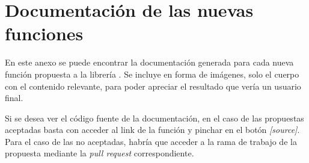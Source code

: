 \chapter{Documentación de las nuevas funciones} \label{chp:anexo_docs_funcs}

En este anexo se puede encontrar la documentación generada para cada nueva función propuesta a la librería \pvlibpy. Se incluye en forma de imágenes, solo el cuerpo con el contenido relevante, para poder apreciar el resultado que vería un usuario final.

Si se desea ver el código fuente de la documentación, en el caso de las propuestas aceptadas basta con acceder al link de la función y pinchar en el botón \textit{[source]}. Para el caso de las no aceptadas, habría que acceder a la \gls{rama} de trabajo de la propuesta mediante la \textit{\gls{pull request}} correspondiente.

